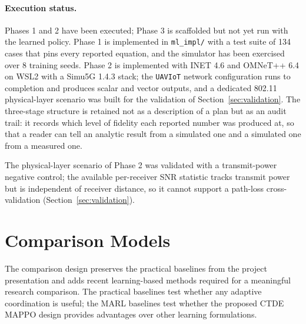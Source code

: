 \documentclass[conference]{IEEEtran}
\newcommand{\tokMappoNSeeds}{8}
\newcommand{\tokNTests}{134}
\begin{document}
\paragraph{Execution status.}
Phases 1 and 2 have been executed; Phase 3 is scaffolded but not yet run with the learned policy. Phase 1 is implemented in \texttt{ml\_impl/} with a test suite of \tokNTests{} cases that pins every reported equation, and the simulator has been exercised over \tokMappoNSeeds{} training seeds. Phase 2 is implemented with INET 4.6 and OMNeT++ 6.4 on WSL2 with a Simu5G 1.4.3 stack; the \texttt{UAVIoT} network configuration runs to completion and produces scalar and vector outputs, and a dedicated 802.11 physical-layer scenario was built for the validation of Section~\ref{sec:validation}. The three-stage structure is retained not as a description of a plan but as an audit trail: it records which level of fidelity each reported number was produced at, so that a reader can tell an analytic result from a simulated one and a simulated one from a measured one.

The physical-layer scenario of Phase 2 was validated with a transmit-power negative control; the available per-receiver SNR statistic tracks transmit power but is independent of receiver distance, so it cannot support a path-loss cross-validation (Section~\ref{sec:validation}).


\section{Comparison Models}
\label{sec:comparison}
The comparison design preserves the practical baselines from the project presentation and adds recent learning-based methods required for a meaningful research comparison. The practical baselines test whether any adaptive coordination is useful; the MARL baselines test whether the proposed CTDE MAPPO design provides advantages over other learning formulations.
\end{document}
